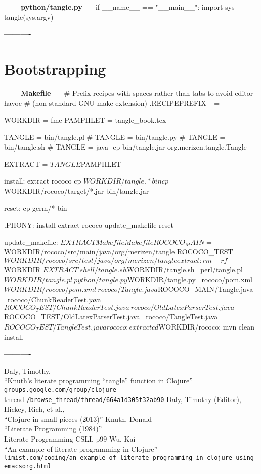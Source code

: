 \documentclass{book}
\newenvironment{chunk}[1]{%
{\ }\newline\noindent%
\hbox{\hskip 2.0cm}{\bf --- #1 ---}%
\verbatim}%                               say exactly what we see
{\endverbatim%
\par{}%
\noindent{}%
\hbox{\hskip 2.0cm}{\bf ----------}%
\par%
\normalsize\noindent}%
\begin{document}
\begin{chunk}{python/tangle.py}
if __name__ == "__main__":
    import sys
    tangle(sys.argv)
\end{chunk}

\chapter{Bootstrapping}
\begin{chunk}{Makefile}
# Prefix recipes with spaces rather than tabs to avoid editor havoc
# (non-standard GNU make extension)
.RECIPEPREFIX +=

WORKDIR = fme
PAMPHLET = tangle_book.tex

TANGLE = bin/tangle.pl
# TANGLE = bin/tangle.py
# TANGLE = bin/tangle.sh
# TANGLE = java -cp bin/tangle.jar org.merizen.tangle.Tangle

EXTRACT = ${TANGLE} ${PAMPHLET}

install: extract rococo
    cp ${WORKDIR}/tangle.* bin
    cp ${WORKDIR}/rococo/target/*.jar bin/tangle.jar

reset:
    cp germ/* bin

.PHONY: install extract rococo update_makefile reset

update_makefile:
    ${EXTRACT} Makefile Makefile

ROCOCO_MAIN = ${WORKDIR}/rococo/src/main/java/org/merizen/tangle
ROCOCO_TEST = ${WORKDIR}/rococo/src/test/java/org/merizen/tangle

extract:
    rm -rf ${WORKDIR}
    ${EXTRACT} \
        shell/tangle.sh ${WORKDIR}/tangle.sh \
        perl/tangle.pl ${WORKDIR}/tangle.pl \
        python/tangle.py ${WORKDIR}/tangle.py \
        rococo/pom.xml  ${WORKDIR}/rococo/pom.xml \
        rococo/Tangle.java ${ROCOCO_MAIN}/Tangle.java \
        rococo/ChunkReaderTest.java ${ROCOCO_TEST}/ChunkReaderTest.java \
        rococo/OldLatexParserTest.java ${ROCOCO_TEST}/OldLatexParserTest.java \
        rococo/TangleTest.java ${ROCOCO_TEST}/TangleTest.java

rococo: extract
    cd ${WORKDIR}/rococo; mvn clean install
\end{chunk}


\cleardoublepage
\phantomsection
{}
\begin{thebibliography}{99}
\bibitem[Dal10]{Dal10}
Daly, Timothy,\\
 “Knuth's literate programming “tangle” function in Clojure”\\
\verb|groups.google.com/group/clojure|\\
thread \verb|/browse_thread/thread/664a1d305f32ab90|
Daly, Timothy (Editor), Hickey, Rich, et al.,\\
“Clojure in small pieces (2013)”
\bibitem[Knu84]{Knu84} Knuth, Donald\\ 
“Literate Programming (1984)” \\
Literate Programming CSLI, p99
\bibitem[Wu13]{Wu13} Wu, Kai\\
“An example of literate programming in Clojure”\\
\verb|limist.com/coding/an-example-of-literate-programming-in-clojure-using-emacsorg.html|
\end{thebibliography}
\clearpage
\paragraph{} %
\printindex
\end{document}
